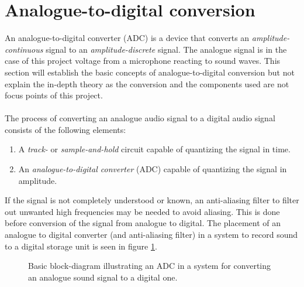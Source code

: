 \section{Analogue-to-digital conversion} \label{ADC}
An analogue-to-digital converter (ADC) is a device that converts an \textit{amplitude-continuous} signal to an \textit{amplitude-discrete} signal.  The analogue signal is in the case of this project voltage from a microphone reacting to sound waves. This section will establish the basic concepts of analogue-to-digital conversion but not explain the in-depth theory as the conversion and the components used are not focus points of this project.
\\ \\
The process of converting an analogue audio signal to a digital audio signal consists of the following elements:
\begin{enumerate}
\item A \textit{track-} or \textit{sample-and-hold} circuit capable of quantizing the signal in time.
\item An \textit{analogue-to-digital converter} (ADC) capable of quantizing the signal in amplitude.
\end{enumerate}
If the signal is not completely understood or known, an anti-aliasing filter to filter out unwanted high frequencies may be needed to avoid aliasing. This is done before conversion of the signal from analogue to digital. The placement of an analogue to digital converter (and anti-aliasing filter) in a system to record sound to a digital storage unit is seen in figure \ref{fig:input}.
\begin{figure}[H]
\centering
{}
\caption{Basic block-diagram illustrating an ADC in a system for converting an analogue sound signal to a digital one.} 
\label{fig:input}
\end{figure}
%

